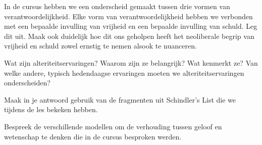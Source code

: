 \documentclass[main.tex]{subfiles}
\begin{document}
\begin{examenvraag}
    \begin{vraag}
        In de cursus hebben we een onderscheid gemaakt tussen drie vormen van verantwoordelijkheid. Elke vorm van verantwoordelijkheid hebben we verbonden met een bepaalde invulling van vrijheid en een bepaalde invulling van schuld. Leg dit uit. Maak ook duidelijk hoe dit ons geholpen heeft het neoliberale begrip van vrijheid en schuld zowel ernstig te nemen alsook te nuanceren.
    \end{vraag}

    \begin{antwoord}
    \end{antwoord}
\end{examenvraag}


\begin{examenvraag}
    \begin{vraag}
        Wat zijn alteriteitservaringen? Waarom zijn ze belangrijk? Wat kenmerkt ze? Van welke andere, typisch hedendaagse ervaringen moeten we alteriteitservaringen onderscheiden?
    \end{vraag}

    \begin{antwoord}
    \end{antwoord}
\end{examenvraag}


\begin{examenvraag}
    \begin{vraag}
        Maak in je antwoord gebruik van de fragmenten uit Schindler’s List die we tijdens de les bekeken hebben.
    \end{vraag}

    \begin{antwoord}
    \end{antwoord}
\end{examenvraag}


\begin{examenvraag}
    \begin{vraag}
        Bespreek de verschillende modellen om de verhouding tussen geloof en wetenschap te denken die in de cursus besproken werden.
    \end{vraag}

    \begin{antwoord}
    \end{antwoord}
\end{examenvraag}
\end{document}
